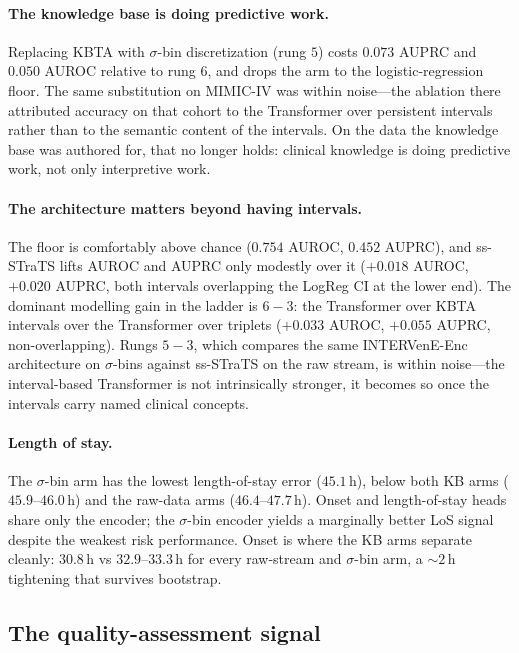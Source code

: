\paragraph{The knowledge base is doing predictive work.}
Replacing KBTA with $\sigma$-bin discretization (rung $5$) costs $0.073$
AUPRC and $0.050$ AUROC relative to rung $6$, and drops the arm to the
logistic-regression floor. The same substitution on MIMIC-IV
\citep{oded2027intervene} was within noise---the ablation there
attributed accuracy on that cohort to the Transformer over persistent
intervals rather than to the semantic content of the intervals. On the
data the knowledge base was authored for, that no longer holds:
clinical knowledge is doing predictive work, not only interpretive
work.

\paragraph{The architecture matters beyond having intervals.}
The floor is comfortably above chance ($0.754$ AUROC, $0.452$ AUPRC),
and ss-STraTS lifts AUROC and AUPRC only modestly over it ($+0.018$
AUROC, $+0.020$ AUPRC, both intervals overlapping the LogReg CI at the
lower end). The dominant modelling gain in the ladder is $6-3$: the
Transformer over KBTA intervals over the Transformer over triplets
($+0.033$ AUROC, $+0.055$ AUPRC, non-overlapping). Rungs $5-3$, which
compares the same INTERVenE-Enc architecture on $\sigma$-bins against
ss-STraTS on the raw stream, is within noise---the interval-based
Transformer is not intrinsically stronger, it becomes so once the
intervals carry named clinical concepts.

\paragraph{Length of stay.}
The $\sigma$-bin arm has the lowest length-of-stay error ($45.1$\,h),
below both KB arms ($45.9$--$46.0$\,h) and the raw-data arms
($46.4$--$47.7$\,h). Onset and length-of-stay heads share only the
encoder; the $\sigma$-bin encoder yields a marginally better LoS
signal despite the weakest risk performance. Onset is where the KB
arms separate cleanly: $30.8$\,h vs $32.9$--$33.3$\,h for every
raw-stream and $\sigma$-bin arm, a $\sim 2$\,h tightening that
survives bootstrap.

\subsection{The quality-assessment signal}
\label{sec:results-qa}

